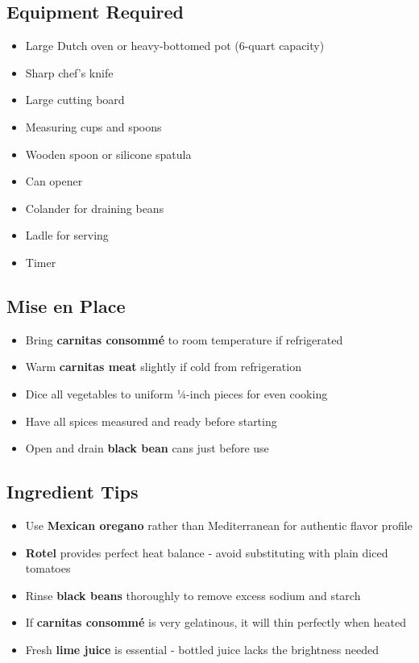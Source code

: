 \documentclass[11pt,letterpaper]{article}
\begin{document}
{\small
\setlength{\columnsep}{20pt}
\setlength{\multicolsep}{6pt}
\begin{multicols}{2}
\setlength{\parindent}{0pt}
\setlength{\parskip}{4pt}

\subsection*{Equipment Required}
\begin{itemize}
    \item Large Dutch oven or heavy-bottomed pot (6-quart capacity)
    \item Sharp chef's knife
    \item Large cutting board
    \item Measuring cups and spoons
    \item Wooden spoon or silicone spatula
    \item Can opener
    \item Colander for draining beans
    \item Ladle for serving
    \item Timer
\end{itemize}

\subsection*{Mise en Place}
\begin{itemize}
    \item Bring \textbf{carnitas consommé} to room temperature if refrigerated
    \item Warm \textbf{carnitas meat} slightly if cold from refrigeration
    \item Dice all vegetables to uniform ¼-inch pieces for even cooking
    \item Have all spices measured and ready before starting
    \item Open and drain \textbf{black bean} cans just before use
\end{itemize}

\subsection*{Ingredient Tips}
\begin{itemize}
    \item Use \textbf{Mexican oregano} rather than Mediterranean for authentic flavor profile
    \item \textbf{Rotel} provides perfect heat balance - avoid substituting with plain diced tomatoes
    \item Rinse \textbf{black beans} thoroughly to remove excess sodium and starch
    \item If \textbf{carnitas consommé} is very gelatinous, it will thin perfectly when heated
    \item Fresh \textbf{lime juice} is essential - bottled juice lacks the brightness needed
\end{itemize}


\end{multicols}}
\end{document}
